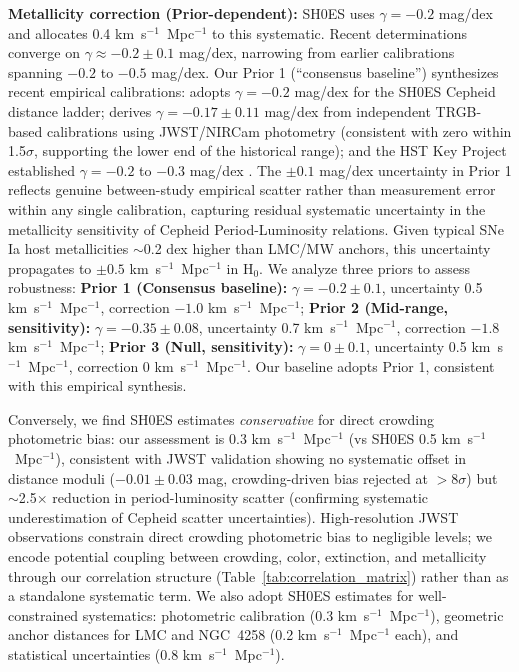 \documentclass[preprint, linenumbers]{aastex701}
\begin{document}
\textbf{Metallicity correction (Prior-dependent):} SH0ES uses $\gamma = -0.2$ mag/dex and allocates 0.4 km~s$^{-1}$~Mpc$^{-1}$ to this systematic. Recent determinations converge on $\gamma \approx -0.2 \pm 0.1$ mag/dex, narrowing from earlier calibrations spanning $-0.2$ to $-0.5$ mag/dex. Our Prior 1 (``consensus baseline'') synthesizes recent empirical calibrations: \citet{Riess2022} adopts $\gamma = -0.2$ mag/dex for the SH0ES Cepheid distance ladder; \citet{Freedman2025a} derives $\gamma = -0.17 \pm 0.11$ mag/dex from independent TRGB-based calibrations using JWST/NIRCam photometry (consistent with zero within 1.5$\sigma$, supporting the lower end of the historical range); and the HST Key Project established $\gamma = -0.2$ to $-0.3$ mag/dex \citep{Freedman2001}. The $\pm 0.1$ mag/dex uncertainty in Prior 1 reflects genuine between-study empirical scatter rather than measurement error within any single calibration, capturing residual systematic uncertainty in the metallicity sensitivity of Cepheid Period-Luminosity relations. Given typical SNe Ia host metallicities $\sim$0.2 dex higher than LMC/MW anchors, this uncertainty propagates to $\pm 0.5$ km~s$^{-1}$~Mpc$^{-1}$ in H$_0$. We analyze three priors to assess robustness: \textbf{Prior 1 (Consensus baseline):} $\gamma = -0.2 \pm 0.1$, uncertainty 0.5 km~s$^{-1}$~Mpc$^{-1}$, correction $-1.0$ km~s$^{-1}$~Mpc$^{-1}$; \textbf{Prior 2 (Mid-range, sensitivity):} $\gamma = -0.35 \pm 0.08$, uncertainty 0.7 km~s$^{-1}$~Mpc$^{-1}$, correction $-1.8$ km~s$^{-1}$~Mpc$^{-1}$; \textbf{Prior 3 (Null, sensitivity):} $\gamma = 0 \pm 0.1$, uncertainty 0.5 km~s$^{-1}$~Mpc$^{-1}$, correction $0$ km~s$^{-1}$~Mpc$^{-1}$. Our baseline adopts Prior 1, consistent with this empirical synthesis.

Conversely, we find SH0ES estimates \textit{conservative} for direct crowding photometric bias: our assessment is 0.3 km~s$^{-1}$~Mpc$^{-1}$ (vs SH0ES 0.5 km~s$^{-1}$~Mpc$^{-1}$), consistent with JWST validation \citep{Riess2024JWST} showing no systematic offset in distance moduli ($-0.01 \pm 0.03$ mag, crowding-driven bias rejected at $>8\sigma$) but $\sim$2.5$\times$ reduction in period-luminosity scatter (confirming systematic underestimation of Cepheid scatter uncertainties). High-resolution JWST observations constrain direct crowding photometric bias to negligible levels; we encode potential coupling between crowding, color, extinction, and metallicity through our correlation structure (Table~\ref{tab:correlation_matrix}) rather than as a standalone systematic term. We also adopt SH0ES estimates for well-constrained systematics: photometric calibration (0.3 km~s$^{-1}$~Mpc$^{-1}$), geometric anchor distances for LMC and NGC~4258 (0.2 km~s$^{-1}$~Mpc$^{-1}$ each), and statistical uncertainties (0.8 km~s$^{-1}$~Mpc$^{-1}$).
\end{document}
